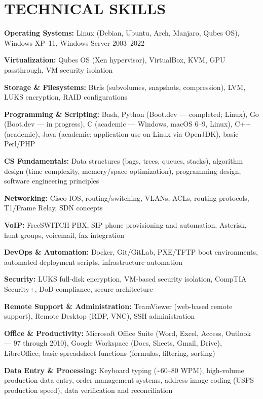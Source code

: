 \documentclass[9pt,letterpaper]{extarticle}
\begin{document}
\section*{TECHNICAL SKILLS}

\noindent\textbf{Operating Systems:} Linux (Debian, Ubuntu, Arch, Manjaro, Qubes OS), Windows XP--11, Windows Server 2003--2022

\noindent\textbf{Virtualization:} Qubes OS (Xen hypervisor), VirtualBox, KVM, GPU passthrough, VM security isolation

\noindent\textbf{Storage \& Filesystems:} Btrfs (subvolumes, snapshots, compression), LVM, LUKS encryption, RAID configurations

\noindent\textbf{Programming \& Scripting:} Bash, Python (Boot.dev --- completed; Linux), Go (Boot.dev --- in progress), C (academic --- Windows, macOS 6--9, Linux), C++ (academic), Java (academic; application use on Linux via OpenJDK), basic Perl/PHP

\noindent\textbf{CS Fundamentals:} Data structures (bags, trees, queues, stacks), algorithm design (time complexity, memory/space optimization), programming design, software engineering principles

\noindent\textbf{Networking:} Cisco IOS, routing/switching, VLANs, ACLs, routing protocols, T1/Frame Relay, SDN concepts

\noindent\textbf{VoIP:} FreeSWITCH PBX, SIP phone provisioning and automation, Asterisk, hunt groups, voicemail, fax integration

\noindent\textbf{DevOps \& Automation:} Docker, Git/GitLab, PXE/TFTP boot environments, automated deployment scripts, infrastructure automation

\noindent\textbf{Security:} LUKS full-disk encryption, VM-based security isolation, CompTIA Security+, DoD compliance, secure architecture

\noindent\textbf{Remote Support \& Administration:} TeamViewer (web-based remote support), Remote Desktop (RDP, VNC), SSH administration

\noindent\textbf{Office \& Productivity:} Microsoft Office Suite (Word, Excel, Access, Outlook --- 97 through 2010), Google Workspace (Docs, Sheets, Gmail, Drive), LibreOffice; basic spreadsheet functions (formulas, filtering, sorting)

\noindent\textbf{Data Entry \& Processing:} Keyboard typing (\textasciitilde{}60--80 WPM), high-volume production data entry, order management systems, address image coding (USPS production speed), data verification and reconciliation
\end{document}
